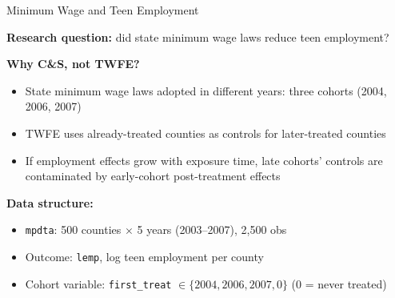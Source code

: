 \documentclass[main.tex]{subfiles}
\begin{document}
\begin{frame}{Minimum Wage and Teen Employment}

  \textbf{Research question:} did state minimum wage laws reduce
  teen employment?

  \medskip
  \textbf{Why C\&S, not TWFE?}
  \begin{itemize}
    \item State minimum wage laws adopted in different years:
      three cohorts (2004, 2006, 2007)
    \item TWFE uses already-treated counties as controls for
      later-treated counties
    \item If employment effects grow with exposure time,
      late cohorts' controls are contaminated by early-cohort
      post-treatment effects
  \end{itemize}

  \medskip
  \textbf{Data structure:}
  \begin{itemize}
    \item \texttt{mpdta}: 500 counties $\times$ 5 years (2003--2007), 2{,}500 obs
    \item Outcome: \texttt{lemp}, log teen employment per county
    \item Cohort variable: \texttt{first\_treat} $\in \{2004, 2006, 2007, 0\}$
      ($0$ = never treated)
  \end{itemize}

\end{frame}
\end{document}
